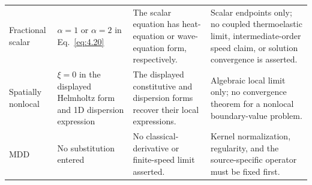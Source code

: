 \begin{table}[htbp]
\begin{tabularx}{\textwidth}{@{}p{2.0cm}p{3.2cm}X p{4.0cm}@{}}
Fractional scalar & $\alpha=1$ or $\alpha=2$ in Eq.~\eqref{eq:4.20} & The scalar equation has heat-equation or wave-equation form, respectively. & Scalar endpoints only; no coupled thermoelastic limit, intermediate-order speed claim, or solution convergence is asserted. \\
Spatially nonlocal & $\xi=0$ in the displayed Helmholtz form and 1D dispersion expression & The displayed constitutive and dispersion forms recover their local expressions. & Algebraic local limit only; no convergence theorem for a nonlocal boundary-value problem. \\
MDD & No substitution entered & No classical-derivative or finite-speed limit asserted. & Kernel normalization, regularity, and the source-specific operator must be fixed first. \\
\bottomrule
\end{tabularx}
\end{table}
